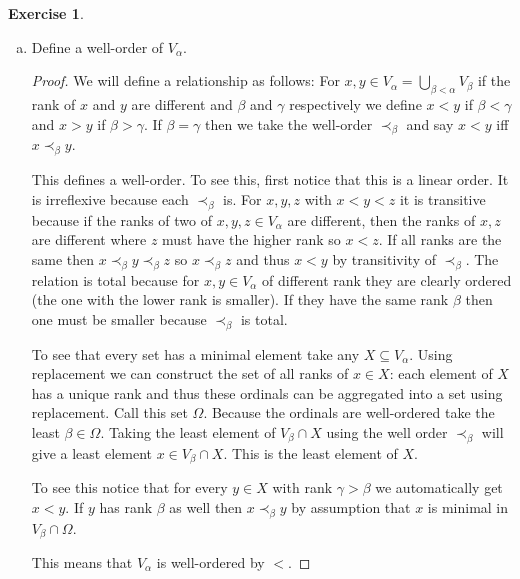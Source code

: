 \documentclass{article}
\theoremstyle{definition}
\newtheorem{question}{Exercise}
\begin{document}
\begin{question}
\begin{enumerate}[a., resume]
        \item Define a well-order of \(V_{\alpha}\).

              \begin{proof}
                  We will define a relationship as follows: For \(x,y\in
                  V_{\alpha}=\bigcup_{\beta<\alpha}V_{\beta}\) if the rank of
                  \(x\) and \(y\) are different and \(\beta\) and \(\gamma\)
                  respectively we define \(x<y\) if \(\beta<\gamma\) and \(x>y\)
                  if \(\beta>\gamma\). If \(\beta=\gamma\) then we take the
                  well-order \(\prec_{\beta}\) and say \(x<y\) iff
                  \(x\prec_{\beta}y\).

                  This defines a well-order. To see this, first notice that this
                  is a linear order. It is irreflexive because each
                  \(\prec_{\beta}\) is. For \(x,y,z\) with \(x<y<z\) it is
                  transitive because if the ranks of two of \(x,y,z\in
                  V_{\alpha}\) are different, then the ranks of \(x,z\) are
                  different where \(z\) must have the higher rank so \(x<z\). If
                  all ranks are the same then \(x\prec_{\beta}y\prec_{\beta}z\)
                  so \(x\prec_{\beta}z\) and thus \(x<y\) by transitivity of
                  \(\prec_{\beta}\). The relation is total because for \(x,y\in
                  V_{\alpha}\) of different rank they are clearly ordered (the
                  one with the lower rank is smaller). If they have the same
                  rank \(\beta\) then one must be smaller because
                  \(\prec_{\beta}\) is total.

                  To see that every set has a minimal element take any
                  \(X\subseteq V_{\alpha}\). Using replacement we can construct
                  the set of all ranks of \(x\in X\): each element of \(X\) has
                  a unique rank and thus these ordinals can be aggregated into a
                  set using replacement. Call this set \(\Omega\). Because the
                  ordinals are well-ordered take the least \(\beta\in\Omega\).
                  Taking the least element of \(V_{\beta}\cap X\) using the well
                  order \(\prec_{\beta}\) will give a least element \(x\in
                  V_{\beta}\cap X\). This is the least element of \(X\).

                  To see this notice that for every \(y\in X\) with rank
                  \(\gamma>\beta\) we automatically get \(x<y\). If \(y\) has
                  rank \(\beta\) as well then \(x\prec_{\beta}y\) by assumption
                  that \(x\) is minimal in \(V_{\beta}\cap\Omega\).

                  This means that \(V_{\alpha}\) is well-ordered by \(<\).
              \end{proof}
    \end{enumerate}
\end{question}
\end{document}
